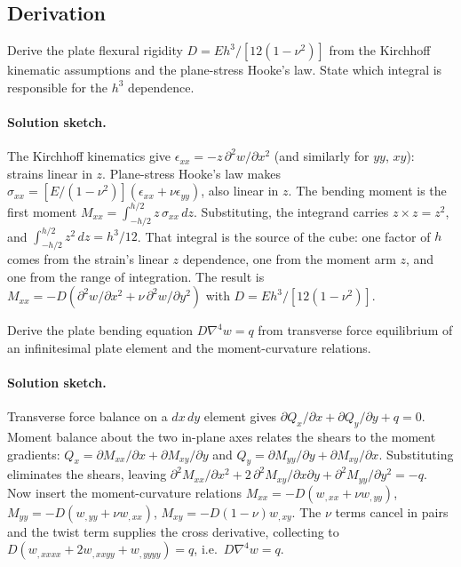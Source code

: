 \subsection*{Derivation}

\begin{exercise}
Derive the plate flexural rigidity $D = E h^3/[12(1-\nu^2)]$ from
the Kirchhoff kinematic assumptions and the plane-stress Hooke's
law. State which integral is responsible for the $h^3$ dependence.

\paragraph{Solution sketch.} The Kirchhoff kinematics give
$\epsilon_{xx} = -z\,\partial^2 w/\partial x^2$ (and similarly for
$yy$, $xy$): strains linear in $z$. Plane-stress Hooke's law makes
$\sigma_{xx} = [E/(1-\nu^2)](\epsilon_{xx}+\nu\epsilon_{yy})$, also
linear in $z$. The bending moment is the first moment $M_{xx} =
\int_{-h/2}^{h/2} z\,\sigma_{xx}\,dz$. Substituting, the integrand
carries $z\times z = z^2$, and $\int_{-h/2}^{h/2} z^2\,dz = h^3/12$.
That integral is the source of the cube: one factor of $h$ comes from
the strain's linear $z$ dependence, one from the moment arm $z$, and
one from the range of integration. The result is $M_{xx} = -D(\partial^2
w/\partial x^2 + \nu\,\partial^2 w/\partial y^2)$ with $D = Eh^3/
[12(1-\nu^2)]$.
\end{exercise}

\begin{exercise}
Derive the plate bending equation $D \nabla^4 w = q$ from
transverse force equilibrium of an infinitesimal plate element
and the moment-curvature relations.

\paragraph{Solution sketch.} Transverse force balance on a $dx\,dy$
element gives $\partial Q_x/\partial x + \partial Q_y/\partial y + q =
0$. Moment balance about the two in-plane axes relates the shears to
the moment gradients: $Q_x = \partial M_{xx}/\partial x + \partial
M_{xy}/\partial y$ and $Q_y = \partial M_{yy}/\partial y + \partial
M_{xy}/\partial x$. Substituting eliminates the shears, leaving
$\partial^2 M_{xx}/\partial x^2 + 2\,\partial^2 M_{xy}/\partial x
\partial y + \partial^2 M_{yy}/\partial y^2 = -q$. Now insert the
moment-curvature relations $M_{xx} = -D(w_{,xx}+\nu w_{,yy})$,
$M_{yy} = -D(w_{,yy}+\nu w_{,xx})$, $M_{xy} = -D(1-\nu)w_{,xy}$. The
$\nu$ terms cancel in pairs and the twist term supplies the cross
derivative, collecting to $D(w_{,xxxx} + 2w_{,xxyy} + w_{,yyyy}) = q$,
i.e.\ $D\nabla^4 w = q$.
\end{exercise}

